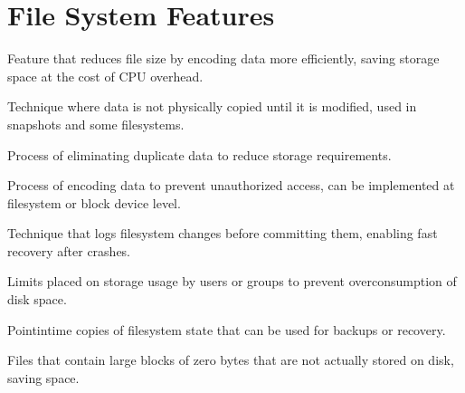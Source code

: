 \documentclass[letterpaper,10pt,english]{sphinxmanual}
\begin{document}
\chapter{File System Features}
\label{\detokenize{glossary:file-system-features}}\begin{description}
\sphinxAtStartPar
Feature that reduces file size by encoding data more efficiently, saving storage space at the cost of CPU overhead.

\sphinxAtStartPar
Technique where data is not physically copied until it is modified, used in snapshots and some filesystems.

\sphinxAtStartPar
Process of eliminating duplicate data to reduce storage requirements.

\sphinxAtStartPar
Process of encoding data to prevent unauthorized access, can be implemented at filesystem or block device level.

\sphinxAtStartPar
Technique that logs filesystem changes before committing them, enabling fast recovery after crashes.

\sphinxAtStartPar
Limits placed on storage usage by users or groups to prevent overconsumption of disk space.

\sphinxAtStartPar
Point\sphinxhyphen{}in\sphinxhyphen{}time copies of filesystem state that can be used for backups or recovery.

\sphinxAtStartPar
Files that contain large blocks of zero bytes that are not actually stored on disk, saving space.

\end{description}
\end{document}
